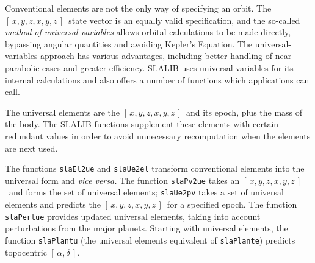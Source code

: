 \documentclass[11pt,fleqn,twoside]{article}
\renewcommand{\_}{{\tt\char'137}}     %
\newcommand{\radec}     {$[\,\alpha,\delta\,]$}
\newcommand{\xyzxyzd}   {$[\,x,y,z,\dot{x},\dot{y},\dot{z}\,]$}
\begin{document}
Conventional elements are not the only way of specifying an orbit.
The \xyzxyzd\ state vector is an equally valid specification,
and the so-called {\it method of universal variables}\/ allows
orbital calculations to be made directly, bypassing angular
quantities and avoiding Kepler's Equation.  The universal-variables
approach has various advantages, including better handling of
near-parabolic cases and greater efficiency.
SLALIB uses universal variables for its internal
calculations and also offers a number of functions which
applications can call.
 
The universal elements are the \xyzxyzd\ and its epoch, plus the mass
of the body.  The SLALIB functions supplement these elements with
certain redundant values in order to
avoid unnecessary recomputation when the elements are next used.
 
The functions
{\tt slaEl2ue} and
{\tt slaUe2el} transform conventional elements into the
universal form and {\it vice versa.}
The function
{\tt slaPv2ue} takes an \xyzxyzd\ and forms the set of universal
elements;
{\tt slaUe2pv} takes a set of universal elements and predicts the \xyzxyzd\
for a specified epoch.
The function
{\tt slaPertue} provides updated universal elements,
taking into account perturbations from the major planets.
Starting with universal elements, the function
{\tt slaPlantu} (the universal elements equivalent of
{\tt slaPlante}) predicts topocentric \radec.
\end{document}
